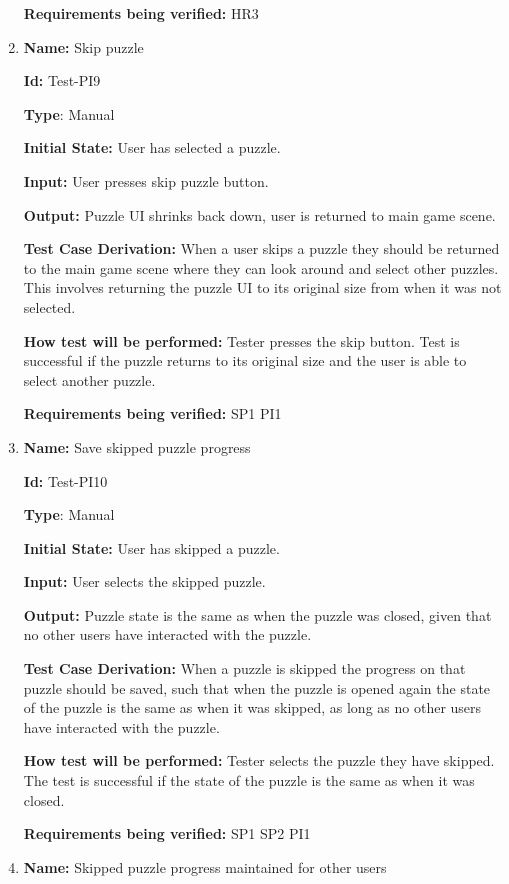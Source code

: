 \documentclass[12pt, titlepage]{article}
\begin{document}
\begin{enumerate}
\textbf{Requirements being verified: } HR3

\item{\textbf{Name:} Skip puzzle} \label{itm:Test-PI10}

\textbf{Id:} Test-PI9

\textbf{Type}: Manual

\textbf{Initial State:} User has selected a puzzle.

\textbf{Input:} User presses skip puzzle button.

\textbf{Output:} Puzzle UI shrinks back down, user is returned to main game scene.

\textbf{Test Case Derivation:}
When a user skips a puzzle they should be returned to the main game scene where they can look around and select other puzzles. This involves returning the puzzle UI to its original size from when it was not selected.

\textbf{How test will be performed:}
Tester presses the skip button. Test is successful if the puzzle returns to its original size and the user is able to select another puzzle.

\textbf{Requirements being verified: } SP1 PI1

\item{\textbf{Name:} Save skipped puzzle progress} \label{itm:Test-PI11}

\textbf{Id:} Test-PI10

\textbf{Type}: Manual

\textbf{Initial State:} User has skipped a puzzle.

\textbf{Input:} User selects the skipped puzzle.

\textbf{Output:} Puzzle state is the same as when the puzzle was closed, given that no other users have interacted with the puzzle.

\textbf{Test Case Derivation:}
When a puzzle is skipped the progress on that puzzle should be saved, such that when the puzzle is opened again the state of the puzzle is the same as when it was skipped, as long as no other users have interacted with the puzzle.

\textbf{How test will be performed:}
Tester selects the puzzle they have skipped. The test is successful if the state of the puzzle is the same as when it was closed.

\textbf{Requirements being verified: } SP1 SP2 PI1

\item{\textbf{Name:} Skipped puzzle progress maintained for other users} \label{itm:Test-PI12}


\end{enumerate}
\end{document}

